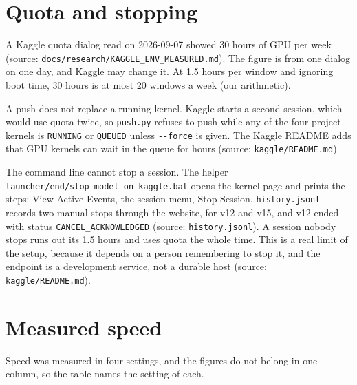 \section{Quota and stopping}

A Kaggle quota dialog read on 2026-09-07 showed 30 hours of GPU per week (source: \texttt{docs/\allowbreak{}research/\allowbreak{}KAGGLE\_\allowbreak{}ENV\_\allowbreak{}MEASURED.\allowbreak{}md}). The figure is from one dialog on one day, and Kaggle may change it. At 1.5 hours per window and ignoring boot time, 30 hours is at most 20 windows a week (our arithmetic).

A push does not replace a running kernel. Kaggle starts a second session, which would use quota twice, so \texttt{push.\allowbreak{}py} refuses to push while any of the four project kernels is \texttt{RUNNING} or \texttt{QUEUED} unless \texttt{-\allowbreak{}-\allowbreak{}force} is given. The Kaggle README adds that GPU kernels can wait in the queue for hours (source: \texttt{kaggle/\allowbreak{}README.\allowbreak{}md}).

The command line cannot stop a session. The helper \texttt{launcher/\allowbreak{}end/\allowbreak{}stop\_\allowbreak{}model\_\allowbreak{}on\_\allowbreak{}kaggle.\allowbreak{}bat} opens the kernel page and prints the steps: View Active Events, the session menu, Stop Session. \texttt{history.\allowbreak{}jsonl} records two manual stops through the website, for v12 and v15, and v12 ended with status \texttt{CANCEL\_\allowbreak{}ACKNOWLEDGED} (source: \texttt{history.\allowbreak{}jsonl}). A session nobody stops runs out its 1.5 hours and uses quota the whole time. This is a real limit of the setup, because it depends on a person remembering to stop it, and the endpoint is a development service, not a durable host (source: \texttt{kaggle/\allowbreak{}README.\allowbreak{}md}).

\section{Measured speed}

Speed was measured in four settings, and the figures do not belong in one column, so the table names the setting of each.

